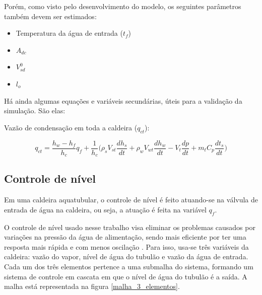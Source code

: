 Porém, como visto pelo desenvolvimento do modelo, os seguintes
parâmetros também devem ser estimados:

\begin{itemize}
\item Temperatura da água de entrada ($ t_f $)
\item $ A_{dc} $
\item $ V_{sd}^0 $
\item $l_o$
\end{itemize}

Há ainda algumas equações e variáveis secundárias, úteis para a
validação da simulação. São elas:

Vazão de condensação em toda a caldeira ($q_{ct}$):

\begin{equation}
  q_{ct} = \dfrac{h_w - h_f}{h_c} q_f + \dfrac{1}{h_c} \biggl( \rho_s
  V_{st} \dfrac{dh_s}{dt} + \rho_w V_{wt} \dfrac{dh_w}{dt} - V_t
  \dfrac{dp}{dt} + m_t C_p \dfrac{dt_s}{dt} \biggr)
  \label{q_ct}
\end{equation}


\subsection{Controle de nível}

Em uma caldeira aquatubular, o controle de nível é feito atuando-se na
válvula de entrada de água na caldeira, ou seja, a atuação é feita na
variável $q_f$.

O controle de nível usado nesse trabalho visa eliminar os problemas
causados por variações na pressão da água de alimentação, sendo mais
eficiente por ter uma resposta mais rápida e com menos oscilação
\cite{ufrj}. Para isso, usa-se três variáveis da caldeira: vazão do
vapor, nível de água do tubulão e vazão da água de entrada. Cada um
dos três elementos pertence a uma submalha do sistema, formando um
sistema de controle em cascata em que o nível de água do tubulão é a
saída. A malha está representada na figura \ref{malha_3_elementos}.

